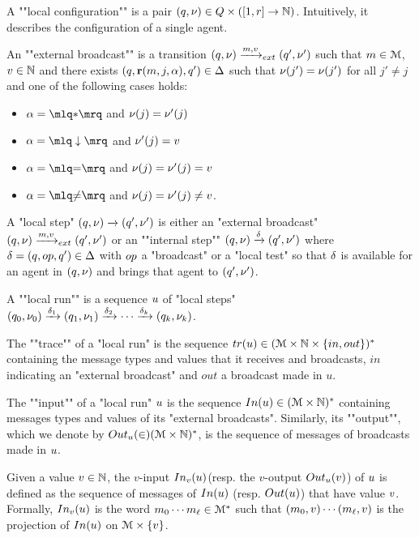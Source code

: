 \begin{definition}			
	A ""local configuration"" is a pair $(q, \nu) \in Q \times ([1,r] \to \mathbb{N})$. Intuitively, it describes the configuration of a single agent. 

	An ""external broadcast"" is a transition $(q,\nu) \xrightarrow{m, v}_{ext} (q',\nu')$ such that $m \in \mathcal{M}$, $v \in \mathbb{N}$ and there exists $(q,\textbf{r}(m, j, \alpha),q') \in \Delta$
	such that $\nu(j') = \nu(j')$ for all $j' \neq j$ and one of the following cases holds:
		\begin{itemize}
			\item $\anact = \quotemarks{\dummyact}$ 
			and $\nu(j) = \nu'(j)$
			\item $\anact = \quotemarks{\enregact}$ and $\nu'(j) = v$
			\item $\anact = \quotemarks{\eqtestact}$ and $\nu(j) = \nu'(j)= v$
			\item $\anact = \quotemarks{\diseqtestact}$ and $\nu(j) = \nu'(j) \ne v$.
		\end{itemize}

	A "local step" $(q,\nu) \xrightarrow{} (q',\nu')$ is either an "external broadcast" $(q,\nu) \xrightarrow{m, v}_{ext} (q',\nu')$ or an ""internal step""  $(q,\nu) \xrightarrow{\delta} (q',\nu')$ where $\atrans = (q,\op,q') \in \transitions$ with $\op$ a "broadcast" or a "local test" so that $\delta$ is available for an agent in $(q, \nu)$ and brings that agent to $(q',\nu')$. 

	A ""local run"" is a sequence $u$ of "local steps" $(q_0, \nu_0) \xrightarrow{\delta_1} (q_1, \nu_1) \xrightarrow{\delta_2} \cdots \xrightarrow{\delta_k} (q_k, \nu_k)$.

	
	The ""trace"" of a "local run" is the sequence $\trace{\localrun} \in (\messages \times \nats \times \set{in, out})^*$ containing the message types and values that it receives and broadcasts, $in$ indicating an "external broadcast" and $out$ a broadcast made in $u$.
	
	The ""input"" of a "local run" $u$ is the sequence $\Input{\localrun} \in (\messages \times \nats)^*$ containing messages types and values of its "external broadcasts".
	Similarly, its ""output"", which we denote by $\voutput{\localrun} \in (\messages \times \nats)^*$, is the sequence of messages of broadcasts made in $u$.
	
	Given a value $v \in \mathbb{N} $, the $v$-input $\vinput{\aval}{\localrun} $(resp. the $v$-output $\voutput{\localrun}{\aval}$) of $u$ is defined as the sequence of messages of $\Input{\localrun}$ (resp. $\Output{\localrun}$) that have value $v$. Formally, $\vinput{\aval}{\localrun}$ is the word $m_0 \cdots m_{\ell} \in \mathcal{M}^*$ such that $(m_0, v) \cdots (m_{\ell}, v)$ is the projection of $\Input{\localrun}$ on $\mathcal{M} \times \{v\}$.  
	

\end{definition}
